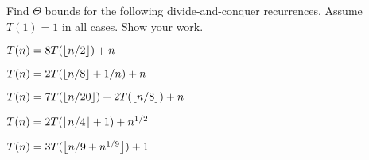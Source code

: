 \documentclass[12pt,twoside]{article}
\begin{document}

\begin{problem}{25}
Find $\Theta$ bounds for the following divide-and-conquer recurrences.
Assume $T(1) = 1$ in all cases.  Show your work.

\begin{problemparts}

 $T(n) = 8T(\left\lfloor n/2\right\rfloor) + n$

 $T(n) = 2T(\left\lfloor n/8\right\rfloor + 1/n)+n$

 $T(n) = 7T(\left\lfloor n/20\right\rfloor) + 2T(\left\lfloor n/8\right\rfloor) + n$

 $T(n) = 2T(\left\lfloor n/4\right\rfloor+1)+n^{1/2}$

 $T(n) = 3T(\left\lfloor n/9+n^{1/9}\right\rfloor) + 1$

\end{problemparts}

\end{problem}
\end{document}
